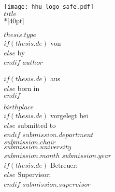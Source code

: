 \begin{titlepage}
  \centering
  \texttt{[image: hhu\_logo\_safe.pdf]}\\

  \vfill
  \huge
  $title$\\*[40pt]
  \normalsize

  \vfill
  \large
  $thesis.type$\\[0.25em]
  \normalsize
  $if(thesis.de)$
    von\\
  $else$
    by\\
  $endif$
  \Large
  $author$\\

  \vspace{5mm}
  \normalsize

  $if(thesis.de)$
    aus\\
  $else$
    born in\\
  $endif$

  $birthplace$\\[1cm]
  $if(thesis.de)$
    vorgelegt bei\\[5mm]
  $else$
    submitted to\\[5mm]
  $endif$
  $submission.department$\\
  $submission.chair$\\
     
  $submission.university$\\[0.5cm]
  $submission.month$ $submission.year$\\[0.5cm]
  $if(thesis.de)$
    Betreuer:\\
  $else$
    Supervisor:\\
  $endif$
  $submission.supervisor$
\end{titlepage}

